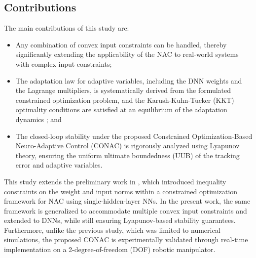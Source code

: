 \documentclass[letterpaper, journal]{IEEEtran}
\begin{document}
\subsection{Contributions}

The main contributions of this study are:
\begin{itemize}

  \item
  Any combination of convex input constraints can be handled, thereby significantly extending the applicability of the NAC to real-world systems with complex input constraints;
  
  \item 
  The adaptation law for adaptive variables, including the DNN weights and the Lagrange multipliers, is systematically derived from the formulated constrained optimization problem, and the Karush-Kuhn-Tucker (KKT) optimality conditions are satisfied at an equilibrium of the adaptation dynamics \cite[Chap. 12, Thm. 12.1]{Nocedal:2006aa}; and

  \item 
  The closed-loop stability under the proposed Constrained Optimization-Based Neuro-Adaptive Control (CONAC) is rigorously analyzed using Lyapunov theory, ensuring the uniform ultimate boundedness (UUB) of the tracking error and adaptive variables.

\end{itemize}

This study extends the preliminary work in \cite{Ryu:2025ab,Ryu:2025aa}, which introduced inequality constraints on the weight and input norms within a constrained optimization framework for NAC using single-hidden-layer NNs. 
In the present work, the same framework is generalized to accommodate multiple convex input constraints and extended to DNNs, while still ensuring Lyapunov-based stability guarantees.
Furthermore, unlike the previous study, which was limited to numerical simulations, the proposed CONAC is experimentally validated through real-time implementation on a 2-degree-of-freedom (DOF) robotic manipulator.
\end{document}
